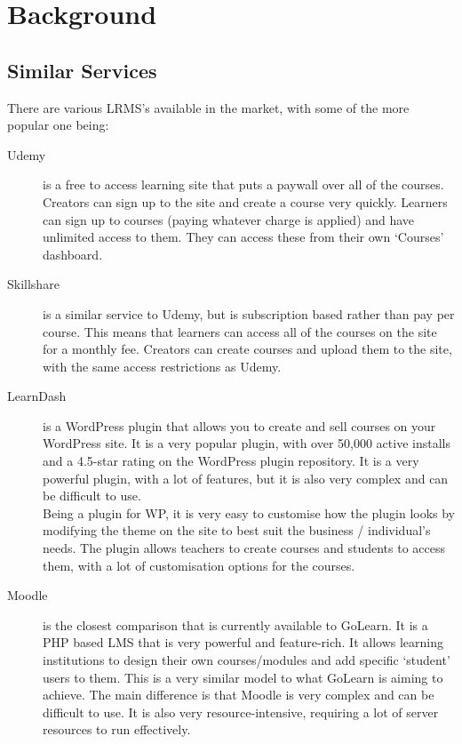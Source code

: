 \documentclass[12pt, a4paper,twoside]{report}
\theoremstyle{plain} %
\theoremstyle{definition} %
\numberwithin{equation}{chapter}
\begin{document}

\chapter{Background}\label{ch:background}

\section{Similar Services}\label{sec:similarservices}

There are various LRMS's available in the market, with some of the more popular
one being:

\begin{description}
    \item[Udemy] {
        is a free to access learning site that puts a paywall over all of
        the courses. Creators can sign up to the site and create a course very
        quickly. Learners can sign up to courses (paying whatever charge is
        applied) and have unlimited access to them. They can access these from
        their own `Courses' dashboard.
        }
    \item[Skillshare] {
        is a similar service to Udemy, but is subscription based rather than
        pay per course. This means that learners can access all of the courses
        on the site for a monthly fee. Creators can create courses and upload
        them to the site, with the same access restrictions as Udemy.
        }
    \item[LearnDash\cite{learndash}] {
        is a WordPress plugin that allows you to create and sell
        courses on your WordPress site. It is a very popular plugin, with
        over 50,000 active installs and a 4.5-star rating on the WordPress
        plugin repository. It is a very powerful plugin, with a lot of
        features, but it is also very complex and can be difficult to use.\\
        Being a plugin for WP, it is very easy to customise how the plugin
        looks by modifying the theme on the site to best suit the business /
        individual's needs. The plugin allows teachers to create courses and
        students to access them, with a lot of customisation options for the
        courses.
        }
    \item[Moodle\cite{moodle}] {
        is the closest comparison that is currently available to GoLearn. It
        is a PHP based LMS that is very powerful and feature-rich. It allows
        learning institutions to design their own courses/modules and add
        specific `student' users to them. This is a very similar model to
        what GoLearn is aiming to achieve. The main difference is that Moodle
        is very complex and can be difficult to use. It is also very
        resource-intensive, requiring a lot of server resources to run
        effectively.
        }
\end{description}
\end{document}

